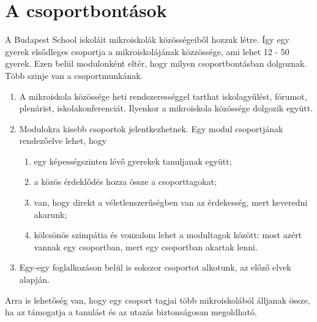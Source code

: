 \section{A csoportbontások}
\label{sec:csoportok}

A Budapest School iskoláit mikroiskolák közösségeiből hozzuk létre. Így egy gyerek elsődleges csoportja a mikroiskolájának közzössége, ami lehet 12 - 50 gyerek. Ezen belül modulonként eltér, hogy milyen csoportbontásban dolgoznak. Több szinje van a csoportmunkának.
\begin{enumerate}
      \item A mikroiskola közössége heti rendszerességgel tarthat iskolagyűlést, fórumot, plenárist, iskolakonferenciát. Ilyenkor a mikroiskola közössége dolgozik együtt.
      \item  Modulokra kisebb csoportok jelentkezhetnek. Egy modul csoportjának rendezőelve lehet, hogy
            \begin{enumerate}
                  \item egy képességszinten lévő gyerekek tanuljanak együtt;
                  \item a közös érdeklődés hozza össze a csoporttagokat;
                  \item van, hogy direkt a véletlenszerűségben van az érdekesség, mert keveredni akarunk;
                  \item kölcsönös szimpátia és vonzalom lehet a modultagok között: most azért vannak egy csoportban, mert egy csoportban akartak lenni.
            \end{enumerate}
      \item  Egy-egy foglalkozáson belül is sokszor csoportot alkotunk, az előző elvek alapján.

\end{enumerate}

Arra is lehetőség van, hogy egy csoport tagjai több mikroiskolából álljanak össze, ha az támogatja a tanulást és az utazás biztonságosan megoldható.